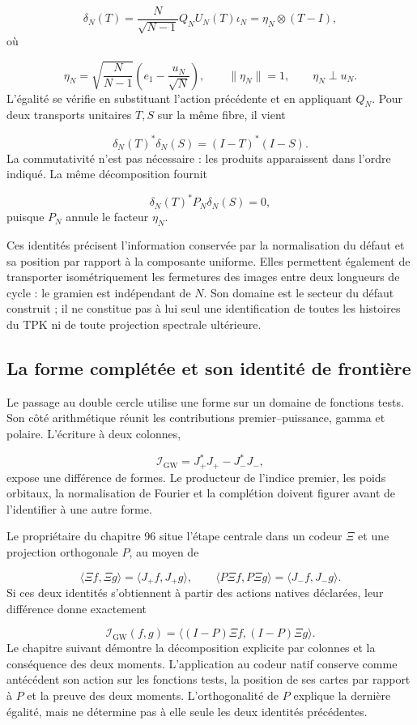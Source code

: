 \[
\delta_N(T)=\frac{N}{\sqrt{N-1}}Q_NU_N(T)\iota_N
=\eta_N\otimes(T-I),
\]
où

\[
\eta_N=\sqrt{\frac N{N-1}}\left(e_1-\frac{u_N}{\sqrt N}\right),
\qquad \|\eta_N\|=1,\qquad \eta_N\perp u_N.
\]
L'égalité se vérifie en substituant l'action précédente et en appliquant \(Q_N\). Pour deux transports unitaires \(T,S\) sur la même fibre, il vient

\[
\delta_N(T)^*\delta_N(S)=(I-T)^*(I-S).
\]
La commutativité n'est pas nécessaire : les produits apparaissent dans l'ordre indiqué. La même décomposition fournit

\[
\delta_N(T)^*P_N\delta_N(S)=0,
\]
puisque \(P_N\) annule le facteur \(\eta_N\).

Ces identités précisent l’information conservée par la normalisation du défaut et sa position par rapport à la composante uniforme. Elles permettent également de transporter isométriquement les fermetures des images entre deux longueurs de cycle : le gramien est indépendant de \(N\). Son domaine est le secteur du défaut construit ; il ne constitue pas à lui seul une identification de toutes les histoires du TPK ni de toute projection spectrale ultérieure.

\subsection{La forme complétée et son identité de frontière}
Le passage au double cercle utilise une forme sur un domaine de fonctions tests. Son côté arithmétique réunit les contributions premier–puissance, gamma et polaire. L'écriture à deux colonnes,

\[
\mathscr I_{\mathrm{GW}}=J_+^*J_+-J_-^*J_-,
\]
expose une différence de formes. Le producteur de l'indice premier, les poids orbitaux, la normalisation de Fourier et la complétion doivent figurer avant de l'identifier à une autre forme.

Le propriétaire du chapitre 96 situe l'étape centrale dans un codeur $\Xi$ et une projection orthogonale $P$, au moyen de

\[
\langle\Xi f,\Xi g\rangle=\langle J_+f,J_+g\rangle,
\qquad
\langle P\Xi f,P\Xi g\rangle=\langle J_-f,J_-g\rangle.
\]
Si ces deux identités s'obtiennent à partir des actions natives déclarées, leur différence donne exactement

\[
\mathscr I_{\mathrm{GW}}(f,g)
=\langle(I-P)\Xi f,(I-P)\Xi g\rangle.
\]
Le chapitre suivant démontre la décomposition explicite par colonnes et la conséquence des deux moments. L'application au codeur natif conserve comme antécédent son action sur les fonctions tests, la position de ses cartes par rapport à $P$ et la preuve des deux moments. L'orthogonalité de $P$ explique la dernière égalité, mais ne détermine pas à elle seule les deux identités précédentes.

